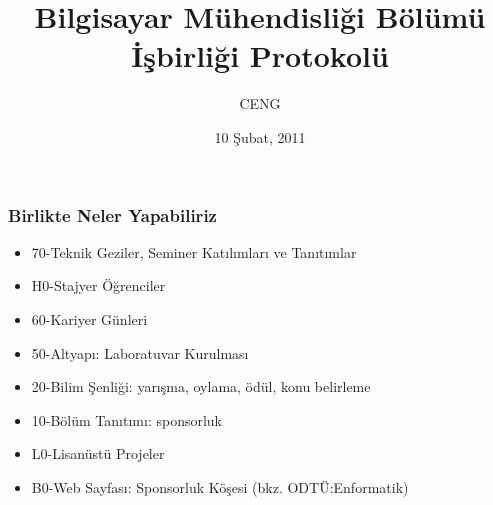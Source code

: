 \documentclass{beamer}
\title{Bilgisayar Mühendisliği Bölümü İşbirliği Protokolü}
\author{CENG}
\date{10 Şubat, 2011}
\institute[2011]{19/x}
\begin{document}
\frame{\titlepage}

\begin{frame}
	\frametitle{Birlikte Neler Yapabiliriz}
	\begin{itemize}
		\item 70-Teknik Geziler, Seminer Katılımları ve Tanıtımlar
		\item H0-Stajyer Öğrenciler
		\item 60-Kariyer Günleri
		\item 50-Altyapı: Laboratuvar Kurulması
		\item 20-Bilim Şenliği: yarışma, oylama, ödül, konu belirleme
		\item 10-Bölüm Tanıtımı: sponsorluk
		\item L0-Lisanüstü Projeler
		\item B0-Web Sayfası: Sponsorluk Köşesi (bkz. ODTÜ:Enformatik)
	\end{itemize}
\end{frame}
\end{document}
